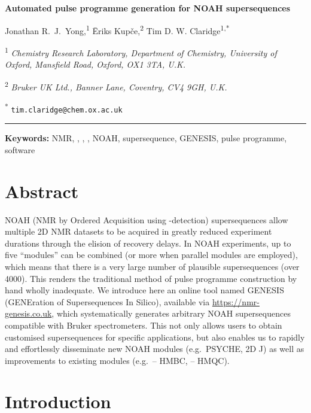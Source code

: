 \documentclass[a4paper,11pt]{article}
\newcommand{\genesistitle}{Automated pulse programme generation for NOAH supersequences}
\newcommand{\crl}{Chemistry Research Laboratory, Department of Chemistry, University of Oxford, Mansfield Road, Oxford, OX1 3TA, U.K.}
\newcommand{\brukeruk}{Bruker UK Ltd., Banner Lane, Coventry, CV4 9GH, U.K.}
\newcommand{\proton}{\ch{^{1}H}}
\newcommand{\carbon}{\ch{^{13}C}}
\newcommand{\nitrogen}{\ch{^{15}N}}
\newcommand{\CH}{\carbon{}--\proton{}}
\newcommand{\NH}{\nitrogen{}--\proton{}}
\newcommand{\theurl}{\url{https://nmr-genesis.co.uk}}
\begin{document}
\begin{refsection}

\begin{center}   %
    \textbf{\Large \genesistitle{}}

    \vspace{0.2cm}

    Jonathan R.\ J.\ Yong,\textsuperscript{1} {\=E}riks Kup{\v{c}}e,\textsuperscript{2} Tim D. W. Claridge\textsuperscript{1,*}

    \vspace{0.2cm}

    \textsuperscript{1} \textit{\crl{}}

    \textsuperscript{2} \textit{\brukeruk{}}

    \textsuperscript{*} \texttt{tim.claridge@chem.ox.ac.uk}

    \vspace{0.5cm} \hrule
\end{center}

\vspace{0.5cm} \textbf{Keywords: } NMR, \proton{}, \carbon{}, \nitrogen{}, NOAH, supersequence, GENESIS, pulse programme, software

\section*{Abstract}

NOAH (NMR by Ordered Acquisition using \proton{}-detection) supersequences allow multiple 2D NMR datasets to be acquired in greatly reduced experiment durations through the elision of recovery delays.
In NOAH experiments, up to five ``modules'' can be combined (or more when parallel modules are employed), which means that there is a very large number of plausible supersequences (over 4000).
This renders the traditional method of pulse programme construction by hand wholly inadequate.
We introduce here an online tool named GENESIS (GENEration of Supersequences In Silico), available via \theurl{}, which systematically generates arbitrary NOAH supersequences compatible with Bruker spectrometers.
This not only allows users to obtain customised supersequences for specific applications, but also enables us to rapidly and effortlessly disseminate new NOAH modules (e.g.\ PSYCHE, 2D J) as well as improvements to existing modules (e.g.\ \CH{} HMBC, \NH{} HMQC).

\section{Introduction}


\end{refsection}
\end{document}
